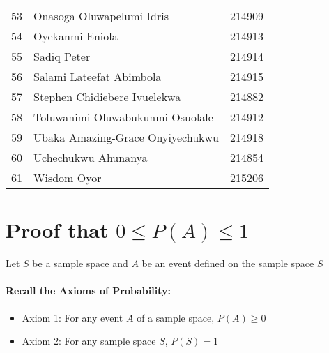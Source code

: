 \documentclass[a4paper]{article}
\begin{document}
\begin{center}
\begin{longtable} { c|l|c }
            53 & Onasoga Oluwapelumi Idris & 214909\\
            54 & Oyekanmi Eniola & 214913\\
            55 & Sadiq Peter & 214914\\
            56 & Salami Lateefat Abimbola & 214915\\
            57 & Stephen Chidiebere Ivuelekwa & 214882\\
            58 & Toluwanimi Oluwabukunmi Osuolale & 214912\\
            59 & Ubaka Amazing-Grace Onyiyechukwu & 214918\\
            60 & Uchechukwu Ahunanya & 214854\\
            61 & Wisdom Oyor & 215206\\
            \bottomrule[4pt]
        \end{longtable}
        \normalsize
    \end{center}

    \newpage

    \section{Proof that $0 \leq P(A) \leq 1$}

    Let $S$ be a sample space and $A$ be an event defined on the sample space $S$

    \paragraph*{Recall the Axioms of Probability:}
    \begin{itemize}
        \item Axiom 1: For any event $A$ of a sample space, $P(A) \ge 0$
        \item Axiom 2: For any sample space $S$, $P(S) = 1$
    \end{itemize}
\end{document}

